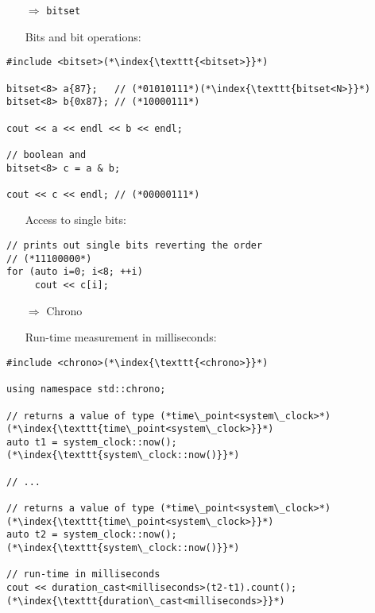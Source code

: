 \documentclass[10pt]{article}
\begin{document}
\begin{enumerate}
\item[$\Rightarrow$] \texttt{bitset}
\end{enumerate}
\begin{enumerate}
\item[] Bits and bit operations:
\end{enumerate}
\begin{lstlisting}
#include <bitset>(*\index{\texttt{<bitset>}}*)

bitset<8> a{87};   // (*01010111*)(*\index{\texttt{bitset<N>}}*)
bitset<8> b{0x87}; // (*10000111*)
    
cout << a << endl << b << endl;
    
// boolean and
bitset<8> c = a & b;
    
cout << c << endl; // (*00000111*)
\end{lstlisting}
\begin{enumerate}
\item[] Access to single bits:
\end{enumerate}
\begin{lstlisting}
// prints out single bits reverting the order
// (*11100000*)
for (auto i=0; i<8; ++i)
     cout << c[i];
\end{lstlisting}
\begin{enumerate}
\item[$\Rightarrow$] Chrono
\end{enumerate}
\begin{enumerate}
\item[] Run-time measurement in milliseconds:
\end{enumerate}
\begin{lstlisting}
#include <chrono>(*\index{\texttt{<chrono>}}*)

using namespace std::chrono;

// returns a value of type (*time\_point<system\_clock>*)(*\index{\texttt{time\_point<system\_clock>}}*)
auto t1 = system_clock::now();(*\index{\texttt{system\_clock::now()}}*)

// ...

// returns a value of type (*time\_point<system\_clock>*)(*\index{\texttt{time\_point<system\_clock>}}*)
auto t2 = system_clock::now();(*\index{\texttt{system\_clock::now()}}*)

// run-time in milliseconds
cout << duration_cast<milliseconds>(t2-t1).count();(*\index{\texttt{duration\_cast<milliseconds>}}*)
\end{lstlisting}
\end{document}
